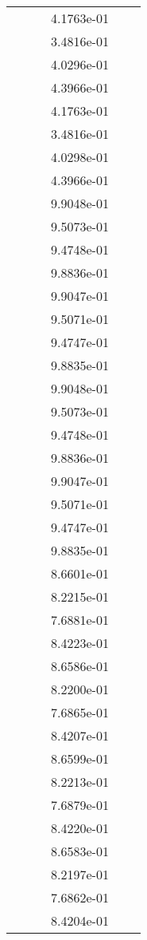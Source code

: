 \begin{xltabular}{\textwidth}{r|rS[table-format=1.3e+2]S[table-format=1.4e+2]S[table-format=1.4e+2]S[table-format=-1.5]}
&  &  & 4.1763e-01 & & \\
&  &  & 3.4816e-01 & & \\
&  &  & 4.0296e-01 & & \\
&  &  & 4.3966e-01 & & \\
&  &  & 4.1763e-01 & & \\
&  &  & 3.4816e-01 & & \\
&  &  & 4.0298e-01 & & \\
&  &  & 4.3966e-01 & & \\
&  &  & 9.9048e-01 & & \\
&  &  & 9.5073e-01 & & \\
&  &  & 9.4748e-01 & & \\
&  &  & 9.8836e-01 & & \\
&  &  & 9.9047e-01 & & \\
&  &  & 9.5071e-01 & & \\
&  &  & 9.4747e-01 & & \\
&  &  & 9.8835e-01 & & \\
&  &  & 9.9048e-01 & & \\
&  &  & 9.5073e-01 & & \\
&  &  & 9.4748e-01 & & \\
&  &  & 9.8836e-01 & & \\
&  &  & 9.9047e-01 & & \\
&  &  & 9.5071e-01 & & \\
&  &  & 9.4747e-01 & & \\
&  &  & 9.8835e-01 & & \\
&  &  & 8.6601e-01 & & \\
&  &  & 8.2215e-01 & & \\
&  &  & 7.6881e-01 & & \\
&  &  & 8.4223e-01 & & \\
&  &  & 8.6586e-01 & & \\
&  &  & 8.2200e-01 & & \\
&  &  & 7.6865e-01 & & \\
&  &  & 8.4207e-01 & & \\
&  &  & 8.6599e-01 & & \\
&  &  & 8.2213e-01 & & \\
&  &  & 7.6879e-01 & & \\
&  &  & 8.4220e-01 & & \\
&  &  & 8.6583e-01 & & \\
&  &  & 8.2197e-01 & & \\
&  &  & 7.6862e-01 & & \\
&  &  & 8.4204e-01 & & \\

\end{xltabular}
